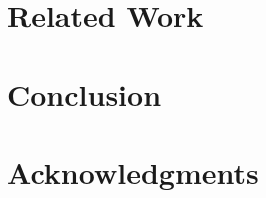 \documentclass[sigconf]{acmart}
\begin{document}
	\section{Related Work}
	
	\section{Conclusion}
	
	\section{Acknowledgments}
	
\end{document}
